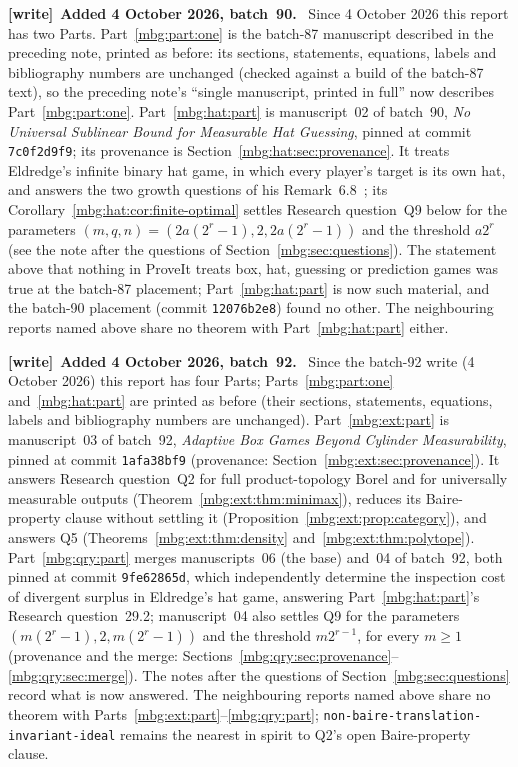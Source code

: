 \documentclass[11pt,letterpaper]{article}
\theoremstyle{definition}
\newenvironment{writenote}[1][]{\par\smallskip\begingroup\small
 \noindent\textbf{[write]}\if\relax\detokenize{#1}\relax\else~\textbf{#1.}\fi\ }%
 {\par\endgroup\smallskip}
\begin{document}
\begin{writenote}[Added 4 October 2026, batch~90]
Since 4 October 2026 this report has two Parts. Part~\ref{mbg:part:one} is the batch-87 manuscript described in the preceding note, printed as before: its sections, statements, equations, labels and bibliography numbers are unchanged (checked against a build of the batch-87 text), so the preceding note's ``single manuscript, printed in full'' now describes Part~\ref{mbg:part:one}. Part~\ref{mbg:hat:part} is manuscript~02 of batch~90, \emph{No Universal Sublinear Bound for Measurable Hat Guessing}, pinned at commit \texttt{7c0f2d9f9}; its provenance is Section~\ref{mbg:hat:sec:provenance}. It treats Eldredge's infinite binary hat game, in which every player's target is its own hat, and answers the two growth questions of his Remark~6.8~\cite{hat:Eldredge}; its Corollary~\ref{mbg:hat:cor:finite-optimal} settles Research question~Q9 below for the parameters $(m,q,n)=(2a(2^r-1),2,2a(2^r-1))$ and the threshold $a2^r$ (see the note after the questions of Section~\ref{mbg:sec:questions}). The statement above that nothing in ProveIt treats box, hat, guessing or prediction games was true at the batch-87 placement; Part~\ref{mbg:hat:part} is now such material, and the batch-90 placement (commit \texttt{12076b2e8}) found no other. The neighbouring reports named above share no theorem with Part~\ref{mbg:hat:part} either.
\end{writenote}

\begin{writenote}[Added 4 October 2026, batch~92]
Since the batch-92 write (4 October 2026) this report has four Parts; Parts~\ref{mbg:part:one} and~\ref{mbg:hat:part} are printed as before (their sections, statements, equations, labels and bibliography numbers are unchanged). Part~\ref{mbg:ext:part} is manuscript~03 of batch~92, \emph{Adaptive Box Games Beyond Cylinder Measurability}, pinned at commit \texttt{1afa38bf9} (provenance: Section~\ref{mbg:ext:sec:provenance}). It answers Research question~Q2 for full product-topology Borel and for universally measurable outputs (Theorem~\ref{mbg:ext:thm:minimax}), reduces its Baire-property clause without settling it (Proposition~\ref{mbg:ext:prop:category}), and answers Q5 (Theorems~\ref{mbg:ext:thm:density} and~\ref{mbg:ext:thm:polytope}). Part~\ref{mbg:qry:part} merges manuscripts~06 (the base) and~04 of batch~92, both pinned at commit \texttt{9fe62865d}, which independently determine the inspection cost of divergent surplus in Eldredge's hat game, answering Part~\ref{mbg:hat:part}'s Research question~29.2; manuscript~04 also settles Q9 for the parameters $(m(2^r-1),2,m(2^r-1))$ and the threshold $m2^{r-1}$, for every $m\ge1$ (provenance and the merge: Sections~\ref{mbg:qry:sec:provenance}--\ref{mbg:qry:sec:merge}). The notes after the questions of Section~\ref{mbg:sec:questions} record what is now answered. The neighbouring reports named above share no theorem with Parts~\ref{mbg:ext:part}--\ref{mbg:qry:part}; \nolinkurl{non-baire-translation-invariant-ideal} remains the nearest in spirit to Q2's open Baire-property clause.
\end{writenote}
\end{document}
